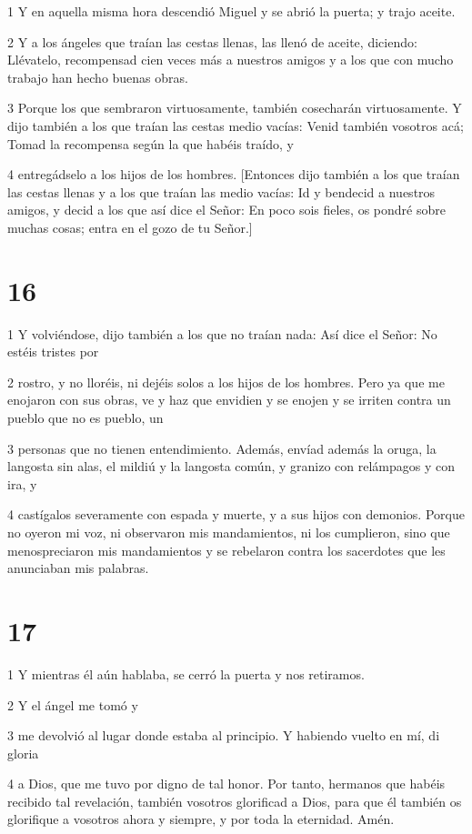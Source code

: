 \par 1 Y en aquella misma hora descendió Miguel y se abrió la puerta; y trajo aceite.

\par 2 Y a los ángeles que traían las cestas llenas, las llenó de aceite, diciendo: Llévatelo, recompensad cien veces más a nuestros amigos y a los que con mucho trabajo han hecho buenas obras.

\par 3 Porque los que sembraron virtuosamente, también cosecharán virtuosamente. Y dijo también a los que traían las cestas medio vacías: Venid también vosotros acá; Tomad la recompensa según la que habéis traído, y

\par 4 entregádselo a los hijos de los hombres. [Entonces dijo también a los que traían las cestas llenas y a los que traían las medio vacías: Id y bendecid a nuestros amigos, y decid a los que así dice el Señor: En poco sois fieles, os pondré sobre muchas cosas; entra en el gozo de tu Señor.]

\chapter{16}

\par 1 Y volviéndose, dijo también a los que no traían nada: Así dice el Señor: No estéis tristes por

\par 2 rostro, y no lloréis, ni dejéis solos a los hijos de los hombres. Pero ya que me enojaron con sus obras, ve y haz que envidien y se enojen y se irriten contra un pueblo que no es pueblo, un

\par 3 personas que no tienen entendimiento. Además, envíad además la oruga, la langosta sin alas, el mildiú y la langosta común, y granizo con relámpagos y con ira, y

\par 4 castígalos severamente con espada y muerte, y a sus hijos con demonios. Porque no oyeron mi voz, ni observaron mis mandamientos, ni los cumplieron, sino que menospreciaron mis mandamientos y se rebelaron contra los sacerdotes que les anunciaban mis palabras.

\chapter{17}

\par 1 Y mientras él aún hablaba, se cerró la puerta y nos retiramos.

\par 2 Y el ángel me tomó y

\par 3 me devolvió al lugar donde estaba al principio. Y habiendo vuelto en mí, di gloria

\par 4 a Dios, que me tuvo por digno de tal honor. Por tanto, hermanos que habéis recibido tal revelación, también vosotros glorificad a Dios, para que él también os glorifique a vosotros ahora y siempre, y por toda la eternidad. Amén.

